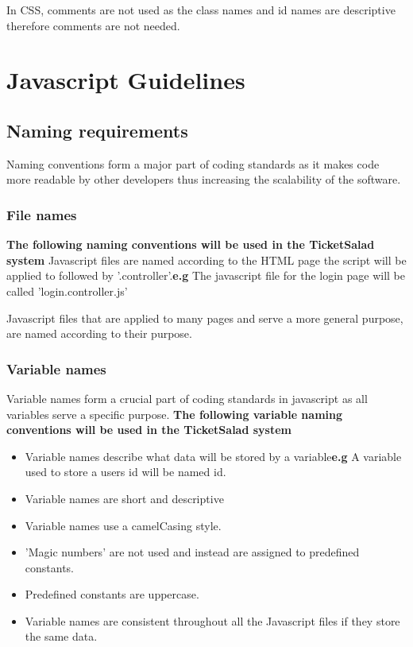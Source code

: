 \documentclass[11pt]{article}
\begin{document}
	In CSS, comments are not used as the class names and id names are descriptive therefore comments are not needed.
	
	\section{Javascript Guidelines}
	\subsection{Naming requirements}
	Naming conventions form a major part of coding standards as it makes code more readable by other developers thus increasing the scalability of the software.
	\subsubsection{File names}
	\textbf{The following naming conventions will be used in the TicketSalad system}
	\newline
	Javascript files are named according to the HTML page the script will be applied to followed by '.controller'.\textbf{e.g} The javascript file for the login page will be called 'login.controller.js'
	
	Javascript files that are applied to many pages and serve a more general purpose, are named according to their purpose.
	\subsubsection{Variable names}
	Variable names form a crucial part of coding standards in javascript as all variables serve a specific purpose.
	\newline
	\textbf{The following variable naming conventions will be used in the TicketSalad system}
	\begin{itemize}
		\item Variable names describe what data will be stored by a variable\textbf{e.g} A variable used to store a users id will be named id.
		\item Variable names are short and descriptive
		\item Variable names use a camelCasing style.
		\item 'Magic numbers' are not used and instead are assigned to predefined constants.
		\item Predefined constants are uppercase.
		\item Variable names are consistent throughout all the Javascript files if they store the same data. 
	\end{itemize}
\end{document}
